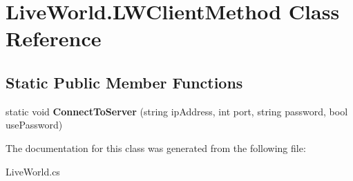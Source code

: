\hypertarget{class_live_world_1_1_l_w_client_method}{}\section{Live\+World.\+L\+W\+Client\+Method Class Reference}
\label{class_live_world_1_1_l_w_client_method}
\subsection*{Static Public Member Functions}
\begin{DoxyCompactItemize}
\item 
\hypertarget{class_live_world_1_1_l_w_client_method_a6534e5c0c6a78fa1911d0b04814d0d69}{}static void {\bfseries Connect\+To\+Server} (string ip\+Address, int port, string password, bool use\+Password)\label{class_live_world_1_1_l_w_client_method_a6534e5c0c6a78fa1911d0b04814d0d69}

\end{DoxyCompactItemize}


The documentation for this class was generated from the following file\+:\begin{DoxyCompactItemize}
\item 
Live\+World.\+cs\end{DoxyCompactItemize}
